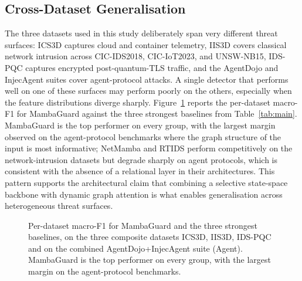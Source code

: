 \documentclass[journal,10pt,twocolumn]{IEEEtran}
\begin{document}
\subsection{Cross-Dataset Generalisation}
\label{sec:generalisation}
The three datasets used in this study deliberately span very different threat surfaces: ICS3D captures cloud and container telemetry, IIS3D covers classical network intrusion across CIC-IDS2018, CIC-IoT2023, and UNSW-NB15, IDS-PQC captures encrypted post-quantum-TLS traffic, and the AgentDojo and InjecAgent suites cover agent-protocol attacks. A single detector that performs well on one of these surfaces may perform poorly on the others, especially when the feature distributions diverge sharply. Figure~\ref{fig:perdataset} reports the per-dataset macro-F1 for MambaGuard against the three strongest baselines from Table~\ref{tab:main}. MambaGuard is the top performer on every group, with the largest margin observed on the agent-protocol benchmarks where the graph structure of the input is most informative; NetMamba and RTIDS perform competitively on the network-intrusion datasets but degrade sharply on agent protocols, which is consistent with the absence of a relational layer in their architectures. This pattern supports the architectural claim that combining a selective state-space backbone with dynamic graph attention is what enables generalisation across heterogeneous threat surfaces.

\begin{figure}[t]
\centering
{}
\caption{Per-dataset macro-F1 for MambaGuard and the three strongest baselines, on the three composite datasets ICS3D, IIS3D, IDS-PQC and on the combined AgentDojo+InjecAgent suite (Agent). MambaGuard is the top performer on every group, with the largest margin on the agent-protocol benchmarks.}
\label{fig:perdataset}
\end{figure}
\end{document}
